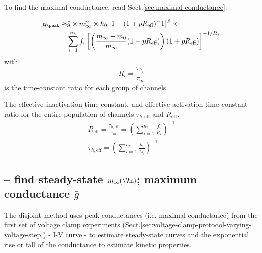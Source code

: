 
To find the maximal conductance, read Sect.\ref{sec:maximal-conductance}.


\begin{equation}
\begin{split}
g_\peak \approx & \bar{g} \times m_\infty^p \times h_0 \left[  1 - (1 + p
R_\text{eff})^-1 \right]^p \times \\
 & \sum_{i=1}^{n_h} f_i \left[  \left( \frac{m_\infty - m_0}{m_\infty} (1 + p
R_\text{eff})  \right) ( 1 + p R_\text{eff}) \right]^{-1/R_i}
\end{split}
\end{equation}
with
\begin{equation}
\label{eq:R_i-time-constant-ratio}
R_i = \frac{\tau_{h_i}}{\tau_m}
\end{equation}
is the time-constant ratio for each group of channels.

The effective inactivation time-constant, and effective activation time-constant
ratio for the entire population of channels $\tau_{h,\text{eff}}$ and
$R_\text{eff}$.
\begin{equation}
\label{eq:R_eff}
\begin{split}
R_\text{eff} = \frac{\tau_{h,\text{eff}}}{\tau_m} = \left( \sum_{i=1}^{n_h}
\frac{f_i}{R_i} \right)^{-1} \\
\tau_{h, \text{eff}} = \left(  \sum_{i=1}^{n_h} \frac{h_i}{\tau_{h_i}}
\right)^{-1}
\end{split}
\end{equation}


\subsection[-- find steady-state m-inf(Vm); maximum conductance
g-bar]{-- find steady-state $m_\infty(\Vm)$; maximum conductance $\bar{g}$}

The disjoint method uses peak conductances (i.e. maximal conductance) from the
first set of voltage clamp experiments
(Sect.\ref{sec:voltage-clamp-protocol-varying-voltage-step}) - I-V curve - to
estimate steady-state curves and the exponential rise or fall of the conductance
to estimate kinetic properties.

